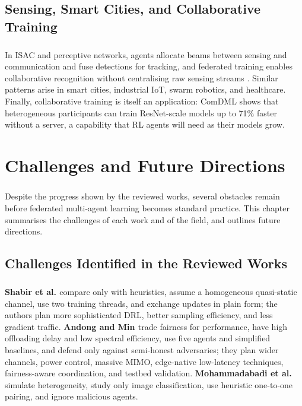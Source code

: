 \documentclass[12pt,a4paper,final]{extreport}
\begin{document}
\section{Sensing, Smart Cities, and Collaborative Training}

\paragraph{} In ISAC and perceptive networks, agents allocate beams between sensing and communication and fuse detections for tracking, and federated training enables collaborative recognition without centralising raw sensing streams \cite{p3}. Similar patterns arise in smart cities, industrial IoT, swarm robotics, and healthcare. Finally, collaborative training is itself an application: ComDML \cite{p4} shows that heterogeneous participants can train ResNet-scale models up to 71\% faster without a server, a capability that RL agents will need as their models grow.

\chapter{Challenges and Future Directions}

\paragraph{} Despite the progress shown by the reviewed works, several obstacles remain before federated multi-agent learning becomes standard practice. This chapter summarises the challenges of each work and of the field, and outlines future directions.

\section{Challenges Identified in the Reviewed Works}

\paragraph{} \textbf{Shabir et al. \cite{p1}} compare only with heuristics, assume a homogeneous quasi-static channel, use two training threads, and exchange updates in plain form; the authors plan more sophisticated DRL, better sampling efficiency, and less gradient traffic. \textbf{Andong and Min \cite{p2}} trade fairness for performance, have high offloading delay and low spectral efficiency, use five agents and simplified baselines, and defend only against semi-honest adversaries; they plan wider channels, power control, massive MIMO, edge-native low-latency techniques, fairness-aware coordination, and testbed validation. \textbf{Mohammadabadi et al. \cite{p4}} simulate heterogeneity, study only image classification, use heuristic one-to-one pairing, and ignore malicious agents.
\end{document}
